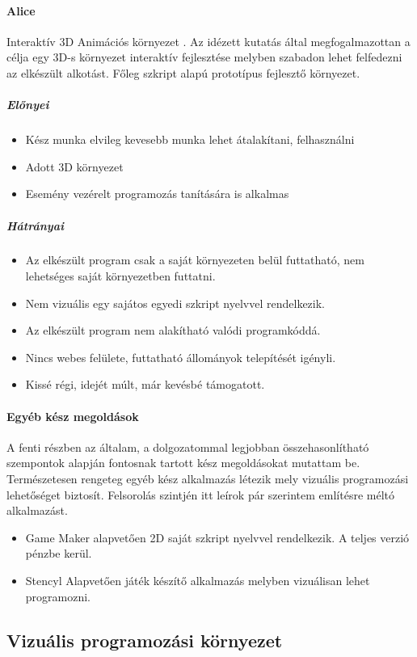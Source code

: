 \documentclass[12pt,a4paper,oneside]{report} %
\begin{document}
\paragraph{Alice} Interaktív 3D Animációs környezet \cite{cooper2000alice}. Az idézett kutatás által megfogalmazottan a  célja egy 3D-s környezet interaktív fejlesztése melyben szabadon lehet felfedezni az elkészült alkotást. Főleg szkript alapú prototípus fejlesztő környezet. 
\subparagraph{Előnyei} 
\begin{itemize}
	\item Kész munka elvileg kevesebb munka lehet átalakítani, felhasználni
	\item Adott 3D környezet
	\item Esemény vezérelt programozás tanítására is alkalmas
\end{itemize}
\subparagraph{Hátrányai} 
\begin{itemize}
	\item Az elkészült program csak a saját környezeten belül futtatható, nem lehetséges saját környezetben futtatni.
	\item Nem vizuális egy sajátos egyedi szkript nyelvvel rendelkezik.
	\item Az elkészült program nem alakítható valódi programkóddá.
	\item Nincs webes felülete, futtatható állományok telepítését igényli.
	\item Kissé régi, idejét múlt, már kevésbé támogatott.
\end{itemize}

\paragraph{Egyéb kész megoldások}
A fenti részben az általam, a dolgozatommal legjobban összehasonlítható szempontok alapján fontosnak tartott kész megoldásokat mutattam be. Természetesen rengeteg egyéb kész alkalmazás létezik mely vizuális programozási lehetőséget biztosít. Felsorolás szintjén itt leírok pár szerintem említésre méltó alkalmazást. 
\begin{itemize}
	\item Game Maker \cite{jenson2016exploring} alapvetően 2D saját szkript nyelvvel rendelkezik. A teljes verzió pénzbe kerül.
	\item Stencyl \cite{liu2014making} Alapvetően játék készítő alkalmazás melyben vizuálisan lehet programozni.
\end{itemize}
\subsection{Vizuális programozási környezet}
\end{document}
